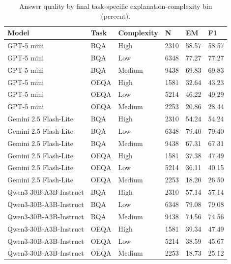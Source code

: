 \begin{table}[t]
\centering
\small
\begin{tabular}{llllll}
\toprule
Model & Task & Complexity & N & EM & F1 \\
\midrule
GPT-5 mini & BQA & High & 2310 & 58.57 & 58.57 \\
GPT-5 mini & BQA & Low & 6348 & 77.27 & 77.27 \\
GPT-5 mini & BQA & Medium & 9438 & 69.83 & 69.83 \\
GPT-5 mini & OEQA & High & 1581 & 32.64 & 43.23 \\
GPT-5 mini & OEQA & Low & 5214 & 46.22 & 49.29 \\
GPT-5 mini & OEQA & Medium & 2253 & 20.86 & 28.44 \\
Gemini 2.5 Flash-Lite & BQA & High & 2310 & 54.24 & 54.24 \\
Gemini 2.5 Flash-Lite & BQA & Low & 6348 & 79.40 & 79.40 \\
Gemini 2.5 Flash-Lite & BQA & Medium & 9438 & 67.31 & 67.31 \\
Gemini 2.5 Flash-Lite & OEQA & High & 1581 & 37.38 & 47.49 \\
Gemini 2.5 Flash-Lite & OEQA & Low & 5214 & 36.11 & 40.15 \\
Gemini 2.5 Flash-Lite & OEQA & Medium & 2253 & 18.20 & 26.50 \\
Qwen3-30B-A3B-Instruct & BQA & High & 2310 & 57.14 & 57.14 \\
Qwen3-30B-A3B-Instruct & BQA & Low & 6348 & 79.08 & 79.08 \\
Qwen3-30B-A3B-Instruct & BQA & Medium & 9438 & 74.56 & 74.56 \\
Qwen3-30B-A3B-Instruct & OEQA & High & 1581 & 39.34 & 47.49 \\
Qwen3-30B-A3B-Instruct & OEQA & Low & 5214 & 38.59 & 45.67 \\
Qwen3-30B-A3B-Instruct & OEQA & Medium & 2253 & 18.73 & 25.12 \\
\bottomrule
\end{tabular}
\caption{Answer quality by final task-specific explanation-complexity bin (percent).}
\label{tab:core-v11-complexity}
\end{table}
